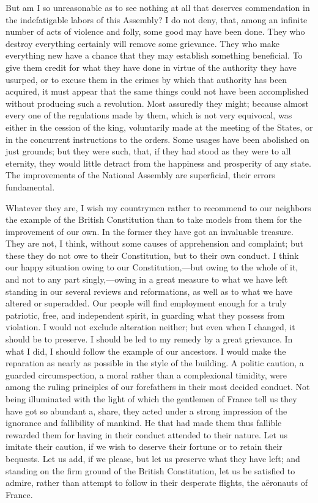 But am I so unreasonable as to see nothing at all that deserves commendation in the indefatigable labors of this Assembly? I do not deny, that, among an infinite number of acts of violence and folly, some good may have been done. They who destroy everything certainly will remove some grievance. They who make everything new have a chance that they may establish something beneficial. To give them credit for what they have done in virtue of the authority they have usurped, or to excuse them in the crimes by which that authority has been acquired, it must appear that the same things could not have been accomplished without producing such a revolution. Most assuredly they might; because almost every one of the regulations made by them, which is not very equivocal, was either in the cession of the king, voluntarily made at the meeting of the States, or in the concurrent instructions to the orders. Some usages have been abolished on just grounds; but they were such, that, if they had stood as they were to all eternity, they would little detract from the happiness and prosperity of any state. The improvements of the National Assembly are superficial, their errors fundamental.

Whatever they are, I wish my countrymen rather to recommend to our neighbors the example of the British Constitution than to take models from them for the improvement of our own. In the former they have got an invaluable treasure. They are not, I think, without some causes of apprehension and complaint; but these they do not owe to their Constitution, but to their own conduct. I think our happy situation owing to our Constitution,—but owing to the whole of it, and not to any part singly,—owing in a great measure to what we have left standing in our several reviews and reformations, as well as to what we have altered or superadded. Our people will find employment enough for a truly patriotic, free, and independent spirit, in guarding what they possess from violation. I would not exclude alteration neither; but even when I changed, it should be to preserve. I should be led to my remedy by a great grievance. In what I did, I should follow the example of our ancestors. I would make the reparation as nearly as possible in the style of the building. A politic caution, a guarded circumspection, a moral rather than a complexional timidity, were among the ruling principles of our forefathers in their most decided conduct. Not being illuminated with the light of which the gentlemen of France tell us they have got so abundant a, share, they acted under a strong impression of the ignorance and fallibility of mankind. He that had made them thus fallible rewarded them for having in their conduct attended to their nature. Let us imitate their caution, if we wish to deserve their fortune or to retain their bequests. Let us add, if we please, but let us preserve what they have left; and standing on the firm ground of the British Constitution, let us be satisfied to admire, rather than attempt to follow in their desperate flights, the aëronauts of France.

